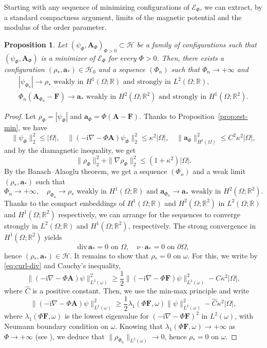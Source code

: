 \documentclass[11pt]{amsart}
\newcommand{\R}{\mathbb R}
\newcommand{\Ab}{\mathbf A}
\newcommand{\Fb}{\mathbf F}
\newcommand{\ab}{\mathbf a}
\newcommand{\ii}{\mathrm i}
\newcommand{\Ef}{\mathcal E_\Phi}
\newcommand{\cH}{\mathcal H}
\newtheorem{proposition}[theorem]{Proposition}
\theoremstyle{definition}
\numberwithin{equation}{section}
\begin{document}
Starting with any sequence of minimizing configurations of $\Ef$, we can  extract, by  a standard compactness argument, limits of the magnetic potential and the modulus of the order parameter.
%
\begin{proposition}\label{prop:conv-density}
Let  $(\psi_\Phi,\Ab_\Phi)_{\Phi>0}\subset\cH$ be a family of configurations such that $(\psi_\Phi,\Ab_\Phi)$ is a minimizer of $\Ef$ for every $\Phi>0$. Then, there exists a configuration $(\rho_*,\ab_*)\in\cH_0$ and a sequence $(\Phi_n)$ such that $\Phi_n\to+\infty$ and
\[
\begin{gathered}
|\psi_{\Phi_n}|\to \rho_*\text{ weakly in }H^1(\Omega;\R)\text{ and strongly in }L^2(\Omega;\R),\\
\Phi_n(\Ab_{\Phi_n}-\Fb)\to \ab_*\text{ weakly in }H^2(\Omega;\R^2) \text{ and strongly in }H^1(\Omega;\R^2).
\end{gathered}\]
\end{proposition}
\begin{proof}
Let $\rho_{\Phi}=|\psi_\Phi|$ and $\ab_\Phi=\Phi(\Ab-\Fb)$. Thanks to Proposition~\ref{prop:est-min},  we have
\[\|\psi_\Phi\|_2^2\leq |\Omega|, \quad \|(-\ii\nabla-\Phi\Ab)\psi_\Phi\|_2^2\leq \kappa^2 |\Omega|,\quad\|\ab_\Phi\|_{H^2(\Omega)}^2\leq C^2\kappa^2 |\Omega|, \]
and by the diamagnetic inequality, we get
\[\|\rho_\Phi\|_2^2+\|\nabla\rho_\Phi\|^2_2\leq (1+\kappa^2)|\Omega|.\]
By the Banach--Alaoglu theorem,  we get a sequence $(\Phi_n)$ and a weak limit $(\rho_*,\ab_*)$  such that
\[\Phi_n\to+\infty,\quad \rho_{\Phi_n}\to\rho_*\text{ weakly in }H^1(\Omega;\R)\text{ and }\ab_{\Phi_n}\to\ab_*\text{ weakly in } H^2(\Omega;\R^2).\]
Thanks to  the compact embeddings of $H^1(\Omega;\R)$ and $H^2(\Omega;\R^2)$ in $L^2(\Omega;\R)$ and $H^1(\Omega;\R^2)$ respectively, we can arrange for the sequences to converge strongly in $L^2(\Omega;\R)$ and $H^1(\Omega;\R^2)$, respectively. The strong convergence in $H^1(\Omega;\R^2)$ yields
\[ \mathrm{div\,}\ab_*=0\text{ on }\Omega,\quad \nu\cdot\ab_*=0\text{ on }\partial\Omega,\]
hence $(\rho_*,\ab_*)\in\cH$. It remains to show that $\rho_*=0$ on $\omega$. For this, we write by \eqref{eq:curl-div} and Cauchy's inequality,
\[\|(-\ii\nabla-\Phi\Ab)\psi\|_{L^2(\omega)}^2\geq \frac12\|(-\ii\nabla-\Phi\Fb)\psi\|_{L^2(\omega)}^2-\widehat C\kappa^2|\Omega|,
 \]
where $\widehat C$ is a positive constant.
Then, we use the min-max principle and write
\[
    \|(-\ii\nabla-\Phi\Ab)\psi\|_{L^2(\omega)}^2\geq \frac12\lambda_1(\Phi\Fb,\omega)\|\psi\|_{L^2(\omega)}^2-\widehat C\kappa^2|\Omega|,
\]
where $\lambda_1(\Phi\Fb,\omega)$ is the lowest eigenvalue for $(-\ii\nabla-\Phi\Fb)^2$ in $L^2(\omega)$, with Neumann boundary condition on $\omega$. Knowing that $\lambda_1(\Phi\Fb,\omega)\to+\infty$ as $\Phi\to+\infty$ (see \cite[Thm.~8.1.1]{FH-b}), we deduce that
$\|\rho_{\Phi_n}\|_{L^2(\omega)}\to0$,
hence $\rho_*=0$ on $\omega$.
\end{proof}
\end{document}
